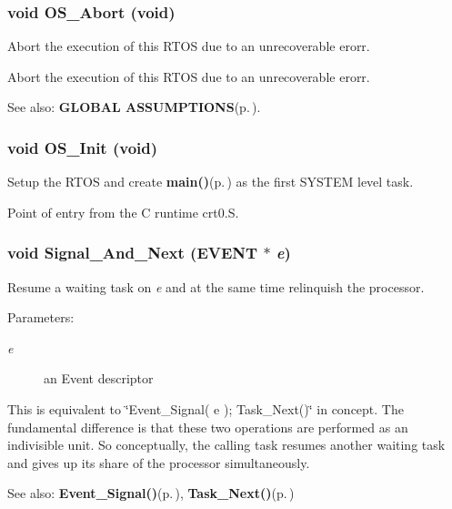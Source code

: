 \subsubsection{\setlength{\rightskip}{0pt plus 5cm}void OS\_\-Abort (void)}\label{os_8h_b5747390a8be675282cb93e5198bd085}


Abort the execution of this RTOS due to an unrecoverable erorr. 

Abort the execution of this RTOS due to an unrecoverable erorr. \begin{Desc}
\item[See also:]{\bf GLOBAL ASSUMPTIONS}{\rm (p.\,\pageref{index_assumptions})}. \end{Desc}
\subsubsection{\setlength{\rightskip}{0pt plus 5cm}void OS\_\-Init (void)}\label{os_8h_cb6df8f47f418aad9c9a9e045d7d1e6d}


Setup the RTOS and create {\bf main()}{\rm (p.\,\pageref{_assignment2_8c_840291bc02cba5474a4cb46a9b9566fe})} as the first SYSTEM level task. 

Point of entry from the C runtime crt0.S. 
\subsubsection{\setlength{\rightskip}{0pt plus 5cm}void Signal\_\-And\_\-Next ({\bf EVENT} $\ast$ {\em e})}\label{os_8h_899044f5840427560c88d0d6e8944629}


Resume a waiting task on {\em e\/} and at the same time relinquish the processor. 

\begin{Desc}
\item[Parameters:]
\begin{description}
\item[{\em e}]an Event descriptor\end{description}
\end{Desc}
This is equivalent to \char`\"{}Event\_\-Signal( e ); Task\_\-Next()\char`\"{} in concept. The fundamental difference is that these two operations are performed as an indivisible unit. So conceptually, the calling task resumes another waiting task and gives up its share of the processor simultaneously. \begin{Desc}
\item[See also:]{\bf Event\_\-Signal()}{\rm (p.\,\pageref{os_8c_39210e081be158dab105c68cb85585cd})}, {\bf Task\_\-Next()}{\rm (p.\,\pageref{os_8c_5a9b72d0dadaea32fec8d4ff1c0eafa4})} \end{Desc}
